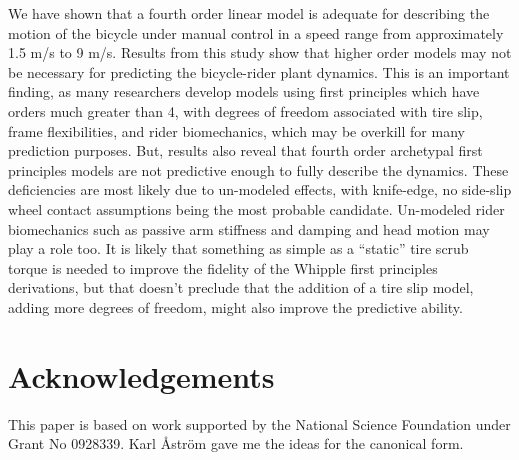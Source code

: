 \documentclass[a4paper]{article}
\begin{document}
We have shown that a fourth order linear model is adequate for describing the
motion of the bicycle under manual control in a speed range from approximately
1.5 m/s to 9 m/s. Results from this study show that higher order models may
not be necessary for predicting the bicycle-rider plant dynamics. This is an
important finding, as many researchers develop models using first principles
which have orders much greater than 4, with degrees of freedom associated with
tire slip, frame flexibilities, and rider biomechanics, which may be overkill
for many prediction purposes. But, results also reveal that fourth order
archetypal first principles models are not predictive enough to fully describe
the dynamics. These deficiencies are most likely due to un-modeled effects,
with knife-edge, no side-slip wheel contact assumptions being the most probable
candidate. Un-modeled rider biomechanics such as passive arm stiffness and
damping and head motion may play a role too. It is likely that something as
simple as a ``static'' tire scrub torque is needed to improve the fidelity of
the Whipple first principles derivations, but that doesn't preclude that the
addition of a tire slip model, adding more degrees of freedom, might also
improve the predictive ability.

\section*{Acknowledgements}

This paper is based on work supported by the National Science Foundation under
Grant No 0928339. Karl {\AA}str{\"o}m gave me the ideas for the canonical form.



\end{document}
